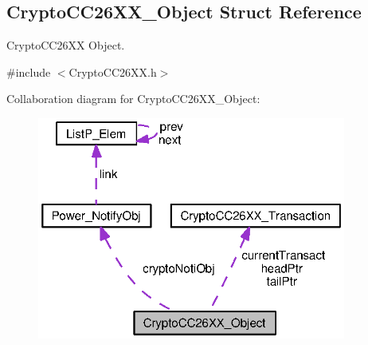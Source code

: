 \subsection{Crypto\+C\+C26\+X\+X\+\_\+\+Object Struct Reference}
\label{struct_crypto_c_c26_x_x___object}


Crypto\+C\+C26\+X\+X Object.  




{\ttfamily \#include $<$Crypto\+C\+C26\+X\+X.\+h$>$}



Collaboration diagram for Crypto\+C\+C26\+X\+X\+\_\+\+Object\+:
\nopagebreak
\begin{figure}[H]
\begin{center}
\leavevmode
\includegraphics[width=288pt]{struct_crypto_c_c26_x_x___object__coll__graph}
\end{center}
\end{figure}
